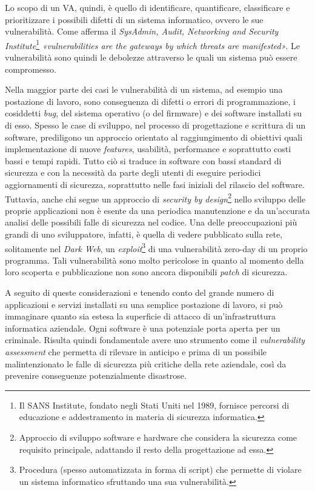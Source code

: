 \documentclass[target=mst,aauheader=]{thud}
\begin{document}
Lo scopo di un VA, quindi, è quello di identificare, quantificare, classificare e prioritizzare i possibili difetti di un sistema informatico, ovvero le sue vulnerabilità. Come afferma il \textit{SysAdmin, Audit, Networking and Security Institute}\footnote{Il SANS Institute, fondato negli Stati Uniti nel 1989, fornisce percorsi di educazione e addestramento in materia di sicurezza informatica.} \textit{«vulnerabilities are the gateways by which threats are manifested»}. Le vulnerabilità sono quindi le debolezze attraverso le quali un sistema può essere compromesso.

Nella maggior parte dei casi le vulnerabilità di un sistema, ad esempio una postazione di lavoro, sono conseguenza di difetti o errori di programmazione, i cosiddetti \textit{bug}, del sistema operativo (o del firmware) e dei software installati su di esso. Spesso le case di sviluppo, nel processo di progettazione e scrittura di un software, prediligono un approccio orientato al raggiungimento di obiettivi quali implementazione di nuove \textit{features}, usabilità, performance e soprattutto costi bassi e tempi rapidi. Tutto ciò si traduce in software con bassi standard di sicurezza e con la necessità da parte degli utenti di eseguire periodici aggiornamenti di sicurezza, soprattutto nelle fasi iniziali del rilascio del software. Tuttavia, anche chi segue un approccio di \textit{security by design}\footnote{Approccio di sviluppo software e hardware che considera la sicurezza come requisito principale, adattando il resto della progettazione ad essa.} nello sviluppo delle proprie applicazioni non è esente da una periodica manutenzione e da un’accurata analisi delle possibili falle di sicurezza nel codice. Una delle preoccupazioni più grandi di uno sviluppatore, infatti, è quella di vedere pubblicato sulla rete, solitamente nel \textit{Dark Web}, un \textit{exploit}\footnote{Procedura (spesso automatizzata in forma di script) che permette di violare un sistema informatico sfruttando una sua vulnerabilità.} di una vulnerabilità zero-day di un proprio programma. Tali vulnerabilità sono molto pericolose in quanto al momento della loro scoperta e pubblicazione non sono ancora disponibili \textit{patch} di sicurezza.

A seguito di queste considerazioni e tenendo conto del grande numero di applicazioni e servizi installati su una semplice postazione di lavoro, si può immaginare quanto sia estesa la superficie di attacco di un’infrastruttura informatica aziendale. Ogni software è una potenziale porta aperta per un criminale. Risulta quindi fondamentale avere uno strumento come il \textit{vulnerability assessment} che permetta di rilevare in anticipo e prima di un possibile malintenzionato le falle di sicurezza più critiche della rete aziendale, così da prevenire conseguenze potenzialmente disastrose.
\end{document}
